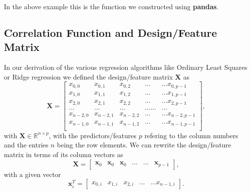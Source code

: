 \documentclass[%
oneside,                 %
final,                   %
10pt]{article}
\begin{document}
In the above example this is the function we constructed using \textbf{pandas}.

\subsection*{Correlation Function and Design/Feature Matrix}

In our derivation of the various regression algorithms like Ordinary Least Squares or Ridge regression we defined the design/feature matrix $\bm{X}$ as
\[
\bm{X}=\begin{bmatrix}
x_{0,0} & x_{0,1} & x_{0,2}& \dots & \dots x_{0,p-1}\\
x_{1,0} & x_{1,1} & x_{1,2}& \dots & \dots x_{1,p-1}\\
x_{2,0} & x_{2,1} & x_{2,2}& \dots & \dots x_{2,p-1}\\
\dots & \dots & \dots & \dots \dots & \dots \\
x_{n-2,0} & x_{n-2,1} & x_{n-2,2}& \dots & \dots x_{n-2,p-1}\\
x_{n-1,0} & x_{n-1,1} & x_{n-1,2}& \dots & \dots x_{n-1,p-1}\\
\end{bmatrix},
\]
with $\bm{X}\in {\mathbb{R}}^{n\times p}$, with the predictors/features $p$  refering to the column numbers and the
entries $n$ being the row elements.
We can rewrite the design/feature matrix in terms of its column vectors as
\[
\bm{X}=\begin{bmatrix} \bm{x}_0 & \bm{x}_0 & \bm{x}_0 & \dots & \dots & \bm{x}_{p-1}\end{bmatrix},
\]
with a given vector
\[
\bm{x}_i^T = \begin{bmatrix}x_{0,i} & x_{1,i} & x_{2,i}& \dots & \dots x_{n-1,i}\end{bmatrix}.
\]
\end{document}
